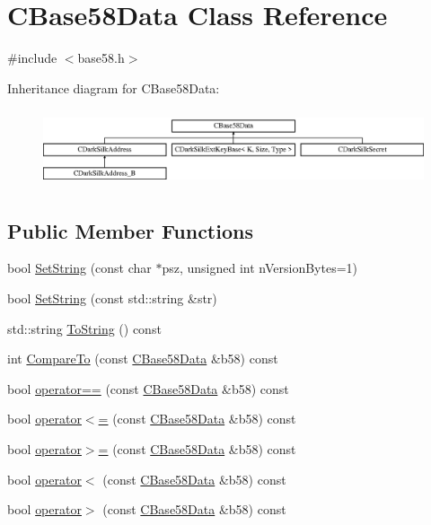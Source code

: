 \hypertarget{class_c_base58_data}{}\section{C\+Base58\+Data Class Reference}
\label{class_c_base58_data}


{\ttfamily \#include $<$base58.\+h$>$}

Inheritance diagram for C\+Base58\+Data\+:\begin{figure}[H]
\begin{center}
\leavevmode
\includegraphics[height=2.285714cm]{class_c_base58_data}
\end{center}
\end{figure}
\subsection*{Public Member Functions}
\begin{DoxyCompactItemize}
\item 
bool \hyperlink{class_c_base58_data_a250fa3bc97d03c7d87de5485c8b49b57}{Set\+String} (const char $\ast$psz, unsigned int n\+Version\+Bytes=1)
\item 
bool \hyperlink{class_c_base58_data_a8e0cba75a3e0a5b21defaf1471d8659c}{Set\+String} (const std\+::string \&str)
\item 
std\+::string \hyperlink{class_c_base58_data_a9a47b10dadff15b8d6a6d0e63ce3ae32}{To\+String} () const 
\item 
int \hyperlink{class_c_base58_data_ab3d18fd9671a383937af7dd4ac2e890a}{Compare\+To} (const \hyperlink{class_c_base58_data}{C\+Base58\+Data} \&b58) const 
\item 
bool \hyperlink{class_c_base58_data_af6448549abaf34142668540a338d180d}{operator==} (const \hyperlink{class_c_base58_data}{C\+Base58\+Data} \&b58) const 
\item 
bool \hyperlink{class_c_base58_data_a126cabad3af6b7d3aec0d6498be1a028}{operator$<$=} (const \hyperlink{class_c_base58_data}{C\+Base58\+Data} \&b58) const 
\item 
bool \hyperlink{class_c_base58_data_a4a96e8ea3716509b307cacfc814e5622}{operator$>$=} (const \hyperlink{class_c_base58_data}{C\+Base58\+Data} \&b58) const 
\item 
bool \hyperlink{class_c_base58_data_a39bac58c4bc4f8abc74a24b769eb1f1d}{operator$<$} (const \hyperlink{class_c_base58_data}{C\+Base58\+Data} \&b58) const 
\item 
bool \hyperlink{class_c_base58_data_a427e472d2fef51aaa89c1a09229ac51a}{operator$>$} (const \hyperlink{class_c_base58_data}{C\+Base58\+Data} \&b58) const 
\end{DoxyCompactItemize}
